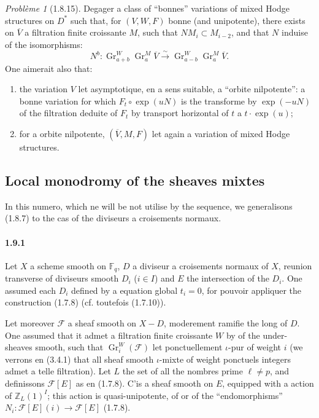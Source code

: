 \documentclass[12pt,a4paper]{article}
\theoremstyle{plain}
\theoremstyle{definition}
\theoremstyle{remark}
\newtheorem{probleme}{Probl\`eme}
\DeclareMathOperator{\Gr}{Gr}
\newcommand{\FF}{{\mathbb{F}}}
\newcommand{\ZZ}{{\mathbb{Z}}}
\begin{document}
\begin{probleme}[1.8.15]
Degager a class of ``bonnes'' variations of mixed Hodge structures on $D^*$ such that, for $(V, W, F)$ bonne (and unipotente), there exists on $\overline{V}$ a filtration finite croissante $M$, such that $NM_i \subset M_{i-2}$, and that $N$ induise of the isomorphisms:
\[ N^b : \Gr_{a+b}^W \Gr_a^M \overline{V} \xrightarrow{\sim} \Gr_{a-b}^W \Gr_a^M \overline{V}. \]
One aimerait also that:
\begin{enumerate}[label=\alph*)]
\item the variation $V$ let asymptotique, en a sens suitable, a ``orbite nilpotente'': a bonne variation for which $F_t \circ \exp(uN)$ is the transforme by $\exp(-uN)$ of the filtration deduite of $F_t$ by transport horizontal of $t$ a $t \cdot \exp(u)$;
\item for a orbite nilpotente, $(\overline{V}, M, F)$ let again a variation of mixed Hodge structures.
\end{enumerate}
\end{probleme}


\subsection{Local monodromy of the sheaves mixtes}

In this numero, which ne will be not utilise by the sequence, we generalisons (1.8.7) to the cas of the diviseurs a croisements normaux.

\paragraph{1.9.1}
Let $X$ a scheme smooth on $\FF_q$, $D$ a diviseur a croisements normaux of $X$, reunion transverse of diviseurs smooth $D_i$ ($i \in I$) and $E$ the intersection of the $D_i$. One assumed each $D_i$ defined by a equation global $t_i = 0$, for pouvoir appliquer the construction (1.7.8) (cf. toutefois (1.7.10)).

Let moreover $\mathscr{F}$ a sheaf smooth on $X - D$, moderement ramifie the long of $D$. One assumed that it admet a filtration finite croissante $W$ by of the under-sheaves smooth, such that $\Gr_i^W(\mathscr{F})$ let ponctuellement $\iota$-pur of weight $i$ (we verrons en (3.4.1) that all sheaf smooth $\iota$-mixte of weight ponctuels integers admet a telle filtration). Let $L$ the set of all the nombres prime $\ell \neq p$, and definissons $\mathscr{F}[E]$ as en (1.7.8). C'is a sheaf smooth on $E$, equipped with a action of $\ZZ_L(1)^I$; this action is quasi-unipotente, of or of the ``endomorphisms'' $N_i : \mathscr{F}[E](i) \to \mathscr{F}[E]$ (1.7.8).
\end{document}
